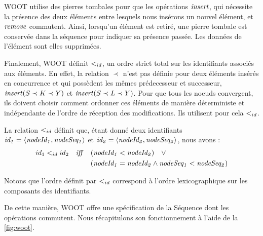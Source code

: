 WOOT utilise des pierres tombales pour que les opérations $\mathit{insert}$, qui nécessite la présence des deux éléments entre lesquels nous insérons un nouvel élément, et $\mathit{remove}$ commutent.
Ainsi, lorsqu'un élément est retiré, une pierre tombale est conservée dans la séquence pour indiquer sa présence passée.
Les données de l'élément sont elles supprimées.

Finalement, WOOT définit $<_{id}$, un ordre strict total sur les identifiants associés aux éléments.
En effet, la relation $\prec$ n'est pas définie pour deux éléments insérés en concurrence et qui possèdent les mêmes prédecesseur et successeur, \eg $\mathit{insert}(S \prec K \prec Y)$ et $\mathit{insert}(S \prec L \prec Y)$.
Pour que tous les noeuds convergent, ils doivent choisir comment ordonner ces éléments de manière déterministe et indépendante de l'ordre de réception des modifications.
Ils utilisent pour cela $<_{id}$.
\begin{definition}
  La relation $<_{id}$ définit que, étant donné deux identifiants $\mathit{id_1} = \langle \mathit{nodeId_1},\mathit{nodeSeq_1} \rangle$ et $\mathit{id_2} = \langle \mathit{nodeId_2},\mathit{nodeSeq_2} \rangle$, nous avons :
  \begin{equation*}
    \begin{split}
      id_1 <_{id} id_2 \quad \mathit{iff} \quad  & (\mathit{nodeId_1} < \mathit{nodeId_2}) \quad \lor \\
                                            & (\mathit{nodeId_1} = \mathit{nodeId_2} \land \mathit{nodeSeq_1} < \mathit{nodeSeq_2}) \\
    \end{split}
  \end{equation*}
\end{definition}
Notons que l'ordre définit par $<_{id}$ correspond à l'ordre lexicographique sur les composants des identifiants.

De cette manière, WOOT offre une spécification de la Séquence dont les opérations commutent.
Nous récapitulons son fonctionnement à l'aide de la \autoref{fig:woot}.

